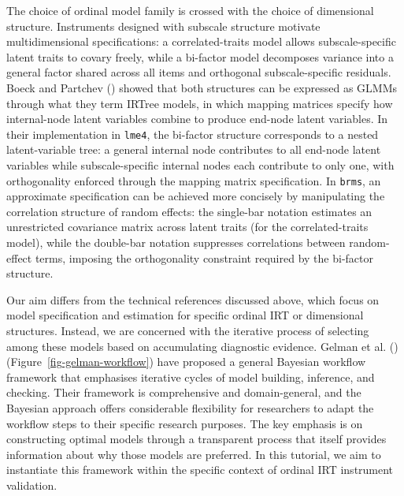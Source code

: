\documentclass[
  man,
  floatsintext,
  longtable,
  nolmodern,
  notxfonts,
  notimes,
  colorlinks=true,linkcolor=blue,citecolor=blue,urlcolor=blue]{apa7}
\begin{document}
The choice of ordinal model family is crossed with the choice of
dimensional structure. Instruments designed with subscale structure
motivate multidimensional specifications: a correlated-traits model
allows subscale-specific latent traits to covary freely, while a
bi-factor model decomposes variance into a general factor shared across
all items and orthogonal subscale-specific residuals. Boeck and Partchev
() showed that both structures can
be expressed as GLMMs through what they term IRTree models, in which
mapping matrices specify how internal-node latent variables combine to
produce end-node latent variables. In their implementation in
\texttt{lme4}, the bi-factor structure corresponds to a nested
latent-variable tree: a general internal node contributes to all
end-node latent variables while subscale-specific internal nodes each
contribute to only one, with orthogonality enforced through the mapping
matrix specification. In \texttt{brms}, an approximate specification can
be achieved more concisely by manipulating the correlation structure of
random effects: the single-bar notation \texttt{\textbar{}} estimates an
unrestricted covariance matrix across latent traits (for the
correlated-traits model), while the double-bar notation
\texttt{\textbar{}\textbar{}} suppresses correlations between
random-effect terms, imposing the orthogonality constraint required by
the bi-factor structure.

Our aim differs from the technical references discussed above, which
focus on model specification and estimation for specific ordinal IRT or
dimensional structures. Instead, we are concerned with the iterative
process of selecting among these models based on accumulating diagnostic
evidence. Gelman et al. ()
(Figure~\ref{fig-gelman-workflow}) have proposed a general Bayesian
workflow framework that emphasises iterative cycles of model building,
inference, and checking. Their framework is comprehensive and
domain-general, and the Bayesian approach offers considerable
flexibility for researchers to adapt the workflow steps to their
specific research purposes. The key emphasis is on constructing optimal
models through a transparent process that itself provides information
about why those models are preferred. In this tutorial, we aim to
instantiate this framework within the specific context of ordinal IRT
instrument validation.
\end{document}
